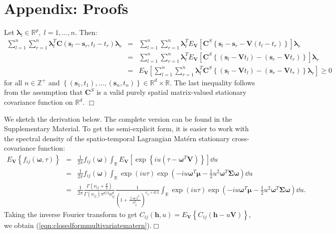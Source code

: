 \documentclass[12pt]{article}
\newcommand{\0}{\mathbf{0}}
\begin{document}
\section*{Appendix: Proofs}


Let $\boldsymbol{\lambda}_l\in\mathbb{R}^{p}, \;l=1,\ldots,n.$ Then:
\begin{eqnarray*}
\sum_{l=1}^{n}\sum_{r=1}^{n}\boldsymbol{\lambda}_l^T\mathbf{C}(\mathbf{s}_{l}-\mathbf{s}_{r},t_{l}-t_{r})\boldsymbol{\lambda}_r &=& \sum_{l=1}^{n}\sum_{r=1}^{n}\boldsymbol{\lambda}_l^TE_{\mathbf{V}}\left[\mathbf{C}^S\left\{\mathbf{s}_l-\mathbf{s}_r-\mathbf{V}(t_l-t_r)\right\}\right]\boldsymbol{\lambda}_r \\
&=&\sum_{l=1}^{n}\sum_{r=1}^{n}\boldsymbol{\lambda}_l^TE_{\mathbf{V}}\left[\mathbf{C}^S\left\{(\mathbf{s}_l-\mathbf{V}t_l)-(\mathbf{s}_r-\mathbf{V}t_r)\right\}\right]\boldsymbol{\lambda}_r \\
&=&E_{\mathbf{V}}\left[\sum_{l=1}^{n}\sum_{r=1}^{n}\boldsymbol{\lambda}_l^T\mathbf{C}^S\left\{(\mathbf{s}_l-\mathbf{V}t_l)-(\mathbf{s}_r-\mathbf{V}t_r)\right\}\boldsymbol{\lambda}_r \right]\geq 0 
\end{eqnarray*}
for all $n\in\mathbb{Z}^+$ and $\left\{(\mathbf{s}_1,t_1),\ldots,(\mathbf{s}_n,t_n)\right\} \in \mathbb{R}^d\times \mathbb{R}$. The last inequality follows from the assumption that $\mathbf{C}^S$ is a valid purely spatial matrix-valued stationary covariance function on $\mathbb{R}^d$. \hfill $\Box$ \\
\vspace{-.8cm}

We sketch the derivation below. The complete version can be found in the Supplementary Material. To get the semi-explicit form, it is easier to work with the spectral density of the spatio-temporal Lagrangian Mat\'{e}rn stationary cross-covariance function:
\begin{eqnarray*}
E_{\mathbf{V}}\left\{f_{ij}(\boldsymbol{\omega},\tau)\right\} &=&\frac{1}{2\pi} f_{ij}(\boldsymbol{\omega})  \int_{\mathbb{R}} E_{\mathbf{V}}\left[\exp\left\{iu\left(\tau-\boldsymbol{\omega}^T\mathbf{V}\right) \right\}\right]\dd u \nonumber \\
&=&\frac{1}{2\pi} f_{ij}(\boldsymbol{\omega})  \int_{\mathbb{R}} \exp(iu\tau) \exp\left(-iu\boldsymbol{\omega}^T\boldsymbol{\mu}-\frac{1}{2}u^2\boldsymbol{\omega}^T\boldsymbol{\Sigma}\boldsymbol{\omega}\right) \dd u \nonumber \\
&=&\frac{1}{2\pi}\frac{\Gamma\left(\nu_{ij}+\frac{d}{2}\right)}{\Gamma\left(\nu_{ij}\right)\pi^{d/2}a_{ij}^{d}} \frac{1}{\left(1+\frac{\|\boldsymbol{\omega}\|^2}{a_{ij}^2}\right)^{\nu_{ij}+d/2}} \int_{\mathbb{R}} \exp(iu\tau) \exp\left(-iu\boldsymbol{\omega}^T\boldsymbol{\mu}-\frac{1}{2}u^2\boldsymbol{\omega}^T\boldsymbol{\Sigma}\boldsymbol{\omega}\right) \dd u.
\end{eqnarray*}
Taking the inverse Fourier transform to get $C_{ij}(\mathbf{h},u)=E_{\mathbf{V}}\left\{C_{ij}\left(\mathbf{h}-u\mathbf{V}\right)\right\}$, we obtain (\ref{eqn:closedformmultivariatematern}).\hfill $\Box$
\vspace{.2cm}
\end{document}
